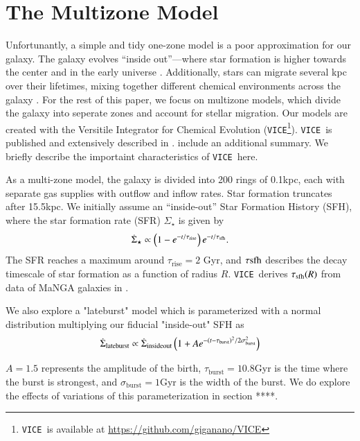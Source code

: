 \documentclass[12pt,oneside]{report}
\newcommand{\VICE}{\texttt{VICE}}
\begin{document}
\chapter{The Multizone Model}\label{sec:vice}

Unfortunantly, a simple and tidy one-zone model is a poor approximation for our galaxy. The galaxy evolves ``inside out''---where star formation is higher towards the center and in the early universe \citep{bird+13}. Additionally, stars can migrate several kpc over their lifetimes, mixing together different chemical environments across the galaxy \citep{bird+12,sellwood+binney02}. For the rest of this paper, we focus on multizone models, which divide the galaxy into seperate zones and account for stellar migration. 
Our models are created with the Versitile Integrator for Chemical Evolution (\VICE\footnote{\VICE~is available at \url{https://github.com/giganano/VICE}}). \VICE~is published and extensively described in \citet{james+21}. \citet{james+22} include an additional summary. We briefly describe the importaint characteristics of \VICE~here.

As a multi-zone model, the galaxy is divided into 200 rings of 0.1kpc, each with separate gas supplies with outflow and inflow rates. Star formation truncates after 15.5kpc. We initially assume an ``inside-out'' Star Formation History (SFH), where the star formation rate (SFR) $\Sigma_\star$ is given by 
\begin{equation}
    \dot{\Sigma}_\star \propto \left(1-e^{-t/\tau_{\rm rise}}\right) e^{-t/\tau_{\rm sfh}}.
\end{equation}
The SFR reaches a maximum around $\tau_\text{rise}=2$ Gyr, and $\tau{\rm sfh}$ describes the decay timescale of star formation as a function of radius $R$. \VICE~derives $\tau_{\rm sfh}(R)$ from data of MaNGA galaxies in \cite{sanches20}.

We also explore a "lateburst" model which is parameterized with a normal distribution multiplying our fiducial "inside-out" SFH as
\begin{equation}\label{eq:lateburst}
    \dot{\Sigma}_{\rm lateburst} \propto \dot{\Sigma}_{\rm insideout} \left(1 + A e^{-(t-\tau_{\rm burst})^2/2\sigma^2_{\rm burst}} \right)
\end{equation}

$A=1.5$ represents the amplitude of the birth, $\tau_\text{burst}=10.8$Gyr is the time where the burst is strongest, and $\sigma_\text{burst}=1$Gyr is the width of the burst. We do explore the effects of variations of this parameterization in section ****.
\end{document}
